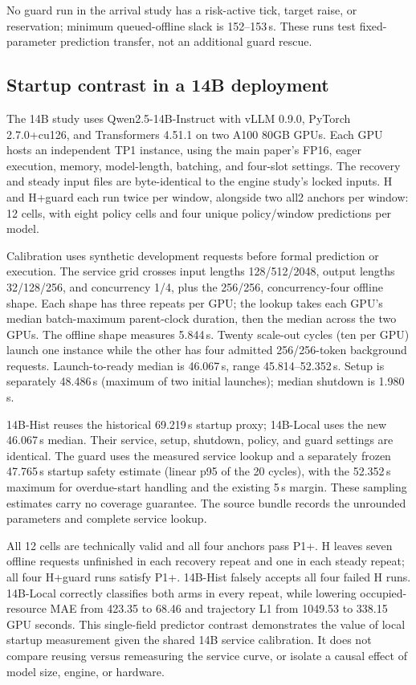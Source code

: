 No guard run in the arrival study has a risk-active tick, target raise, or reservation;
minimum queued-offline slack is 152--153\,s. These runs test fixed-parameter
prediction transfer, not an additional guard rescue.

\subsection{Startup contrast in a 14B deployment}
The 14B study uses Qwen2.5-14B-Instruct with vLLM 0.9.0, PyTorch 2.7.0+cu126,
and Transformers 4.51.1 on two A100 80GB GPUs. Each GPU hosts an independent
TP1 instance, using the main paper's FP16, eager execution, memory,
model-length, batching, and four-slot settings. The recovery and steady
input files are byte-identical to the engine study's locked inputs. H and H+guard each
run twice per window, alongside two all2 anchors per window: 12 cells,
with eight policy cells and four unique policy/window predictions per model.

Calibration uses synthetic development requests before formal prediction
or execution. The service grid crosses input lengths 128/512/2048,
output lengths 32/128/256, and concurrency 1/4, plus the 256/256,
concurrency-four offline shape. Each shape has three repeats per GPU;
the lookup takes each GPU's median batch-maximum parent-clock duration,
then the median across the two GPUs. The offline shape measures 5.844\,s.
Twenty scale-out cycles (ten per GPU) launch one instance while the other
has four admitted 256/256-token background requests. Launch-to-ready
median is 46.067\,s, range 45.814--52.352\,s. Setup is separately 48.486\,s
(maximum of two initial launches); median shutdown is 1.980\,s.

14B-Hist reuses the historical 69.219\,s startup proxy; 14B-Local uses the new
46.067\,s median. Their service, setup, shutdown, policy, and guard settings
are identical. The guard uses the measured service lookup and a separately
frozen 47.765\,s startup safety estimate (linear p95 of the 20 cycles),
with the 52.352\,s maximum for overdue-start handling and the existing 5\,s
margin. These sampling estimates carry no coverage guarantee. The source
bundle records the unrounded parameters and complete service lookup.

All 12 cells are technically valid and all four anchors pass P1+.
H leaves seven offline requests unfinished in each recovery repeat and
one in each steady repeat; all four H+guard runs satisfy P1+.
14B-Hist falsely accepts all four failed H runs. 14B-Local correctly classifies both
arms in every repeat, while lowering occupied-resource MAE from 423.35
to 68.46 and trajectory L1 from 1049.53 to 338.15 GPU seconds.
This single-field predictor contrast demonstrates the value of local startup
measurement given the shared 14B service calibration. It does not compare
reusing versus remeasuring the service curve, or isolate a causal effect of
model size, engine, or hardware.

